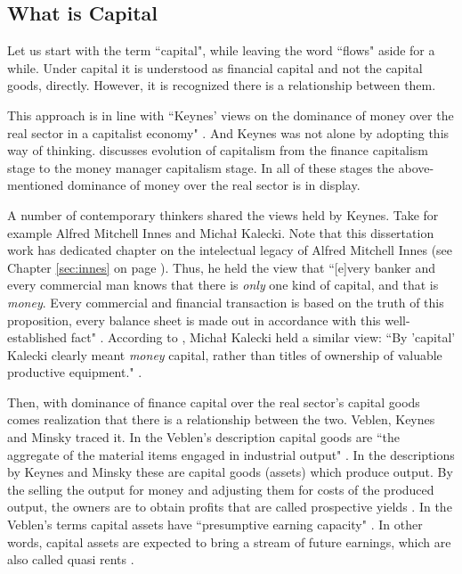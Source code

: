 \subsection{What is Capital}\label{sec:whats_capital}

Let us start with the term ``capital", while leaving the word ``flows" aside for a while. Under capital it is understood as financial capital and not the capital goods, directly. However, it is recognized there is a relationship between them.

This approach is in line with ``Keynes' views on the dominance of money over the real sector in a capitalist economy" \citep{kregel1986a}. And Keynes was not alone by adopting this way of thinking. \cite{wray2009} discusses evolution of capitalism from the finance capitalism stage to the money manager capitalism stage. In all of these stages the above-mentioned dominance of money over the real sector is in display.   

A number of contemporary thinkers shared the views held by Keynes. Take for example Alfred Mitchell Innes and Micha{\l} Kalecki. Note that this dissertation work has dedicated chapter on the intelectual legacy of Alfred Mitchell Innes (see Chapter \ref{sec:innes} on page \pageref{sec:innes}). Thus, he held the view that ``[e]very banker and every commercial man knows that there is \textit{only} one kind of capital, and that is \textit{money}. Every commercial and financial transaction is based on the truth of this proposition, every balance sheet is made out in accordance with this well-established fact" \citep[p.~151, emphasis added]{innes1914}. According to \citeauthor{toporowski2020}, Micha{\l} Kalecki held a similar view: ``By 'capital' Kalecki clearly meant \textit{money} capital, rather than titles of ownership of valuable productive equipment." \citep[p.~139, emphasis original]{toporowski2020}.

Then, with dominance of finance capital over the real sector's capital goods comes realization that there is a relationship between the two. Veblen, Keynes and Minsky traced it. In the Veblen's description capital goods are ``the aggregate of the material items engaged in industrial output" \citep[p.~811]{wray2009}. In the descriptions by Keynes and Minsky these are capital goods (assets) which produce output. By the selling the output for money and adjusting them for costs of the produced output, the owners are to obtain profits that are called prospective yields \citep{keynes1936}. In the Veblen's terms capital assets have ``presumptive earning capacity" \citep[p.~811]{wray2009}. In other words, capital assets are expected to bring a stream of future earnings, which are also called quasi rents \citep{keynes1936}. 

